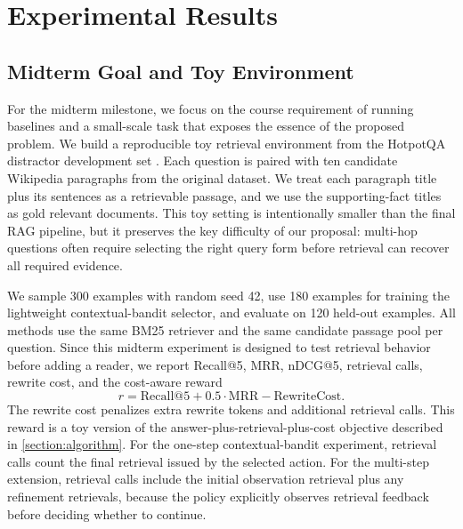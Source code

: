 \section{Experimental Results}
\label{section:exp}

\subsection{Midterm Goal and Toy Environment}
\label{section:exp:toy}
For the midterm milestone, we focus on the course requirement of running baselines and a small-scale task that exposes the essence of the proposed problem. We build a reproducible toy retrieval environment from the HotpotQA distractor development set \citep{yang-etal-2018-hotpotqa}. Each question is paired with ten candidate Wikipedia paragraphs from the original dataset. We treat each paragraph title plus its sentences as a retrievable passage, and we use the supporting-fact titles as gold relevant documents. This toy setting is intentionally smaller than the final RAG pipeline, but it preserves the key difficulty of our proposal: multi-hop questions often require selecting the right query form before retrieval can recover all required evidence.

We sample 300 examples with random seed 42, use 180 examples for training the lightweight contextual-bandit selector, and evaluate on 120 held-out examples. All methods use the same BM25 retriever and the same candidate passage pool per question. Since this midterm experiment is designed to test retrieval behavior before adding a reader, we report Recall@5, MRR, nDCG@5, retrieval calls, rewrite cost, and the cost-aware reward
\[
    r = \mathrm{Recall@5} + 0.5 \cdot \mathrm{MRR} - \mathrm{RewriteCost}.
\]
The rewrite cost penalizes extra rewrite tokens and additional retrieval calls. This reward is a toy version of the answer-plus-retrieval-plus-cost objective described in \cref{section:algorithm}.
For the one-step contextual-bandit experiment, retrieval calls count the final retrieval issued by the selected action. For the multi-step extension, retrieval calls include the initial observation retrieval plus any refinement retrievals, because the policy explicitly observes retrieval feedback before deciding whether to continue.

